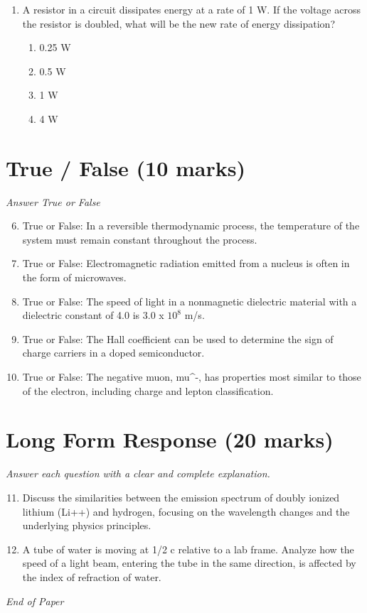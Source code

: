 \documentclass[12pt]{article}
\begin{document}
\begin{enumerate}[label=\arabic*.]
\begin{enumerate}[label=(\alph*)]
    \item 6
    \item 20
\end{enumerate}
\item A resistor in a circuit dissipates energy at a rate of 1 W. If the voltage across the resistor is doubled, what will be the new rate of energy dissipation?
\begin{enumerate}[label=(\alph*)]
    \item 0.25 W
    \item 0.5 W
    \item 1 W
    \item 4 W
\end{enumerate}
\end{enumerate}

\section*{True / False (10 marks)}
\textit{Answer True or False}
\begin{enumerate}[label=\arabic*.]
\setcounter{enumi}{5}
\item True or False: In a reversible thermodynamic process, the temperature of the system must remain constant throughout the process.
\item True or False: Electromagnetic radiation emitted from a nucleus is often in the form of microwaves.
\item True or False: The speed of light in a nonmagnetic dielectric material with a dielectric constant of 4.0 is 3.0 x $10^8$ m/s.
\item True or False: The Hall coefficient can be used to determine the sign of charge carriers in a doped semiconductor.
\item True or False: The negative muon, mu^-, has properties most similar to those of the electron, including charge and lepton classification.
\end{enumerate}

\section*{Long Form Response (20 marks)}
\textit{Answer each question with a clear and complete explanation.}
\begin{enumerate}[label=\arabic*.]
\setcounter{enumi}{10}
\item Discuss the similarities between the emission spectrum of doubly ionized lithium (Li++) and hydrogen, focusing on the wavelength changes and the underlying physics principles.
\item A tube of water is moving at 1/2 c relative to a lab frame. Analyze how the speed of a light beam, entering the tube in the same direction, is affected by the index of refraction of water.
\end{enumerate}

\vfill
\noindent\textit{End of Paper}
\end{document}
